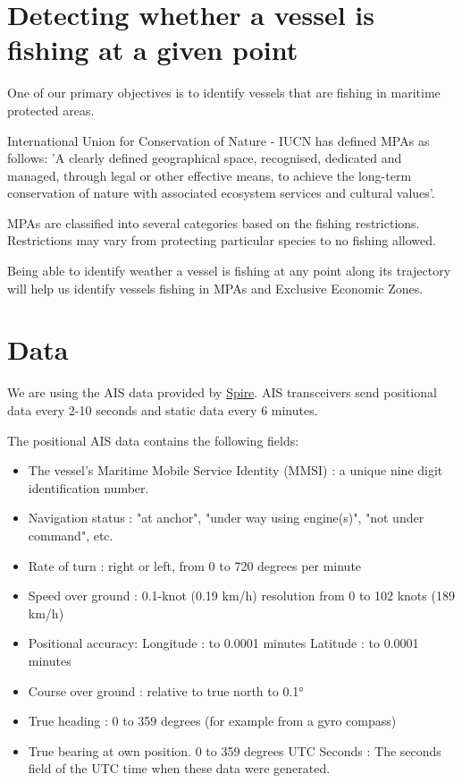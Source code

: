 \section{Detecting whether a vessel is fishing at a given point}
One of our primary objectives is to identify vessels that are fishing in maritime protected areas.

International Union for Conservation of Nature - IUCN has defined MPAs as follows:
'A clearly defined geographical space, recognised, dedicated and managed, through legal or other effective means, to achieve the long-term conservation of nature with associated ecosystem services and cultural values'.

MPAs are classified into several categories based on the fishing restrictions. Restrictions may vary from protecting particular species to no fishing allowed.

Being able to identify weather a vessel is fishing at any point along its trajectory will help us identify vessels fishing in MPAs and Exclusive Economic Zones.

\section{Data}

We are using the AIS data provided by \href{https://spire.com/}{Spire}.
AIS transceivers send positional data every 2-10 seconds and static data every 6 minutes.

The positional AIS data contains the following fields:
\begin{itemize}
\item The vessel's Maritime Mobile Service Identity (MMSI) : a unique nine digit identification number.
\item Navigation status : "at anchor", "under way using engine(s)", "not under command", etc.
\item Rate of turn : right or left, from 0 to 720 degrees per minute
\item Speed over ground : 0.1-knot (0.19 km/h) resolution from 0 to 102 knots (189 km/h)
\item Positional accuracy:
Longitude : to 0.0001 minutes
Latitude : to 0.0001 minutes
\item Course over ground : relative to true north to 0.1°
\item True heading : 0 to 359 degrees (for example from a gyro compass)
\item True bearing at own position. 0 to 359 degrees
UTC Seconds : The seconds field of the UTC time when these data were generated.
\end{itemize}

